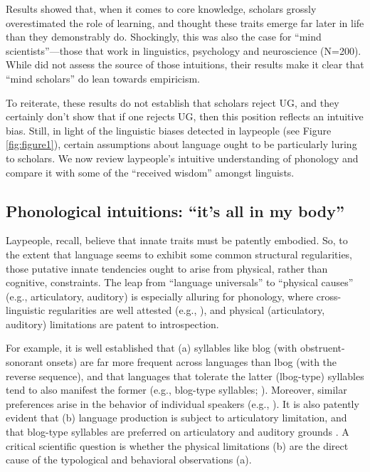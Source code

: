 \documentclass[output=paper,colorlinks,citecolor=brown
]{langscibook}
\begin{document}
Results showed that, when it comes to core knowledge, scholars grossly overestimated the role of learning, and thought these traits emerge far later in life than they demonstrably do. Shockingly, this was also the case for “mind scientists”—those that work in linguistics, psychology and neuroscience (N=200). While \cite{wang2019empiricism} did not assess the source of those intuitions, their results make it clear that “mind scholars” do lean towards empiricism.

To reiterate, these results do not establish that scholars reject UG, and they certainly don’t show that if one rejects UG, then this position reflects an intuitive bias. Still, in light of the linguistic biases detected in laypeople (see Figure \ref{fig:figure1}), certain assumptions about language ought to be particularly luring to scholars. We now review laypeople’s intuitive understanding of phonology and compare it with some of the “received wisdom” amongst linguists. 

\subsection{Phonological intuitions: “it’s all in my body”}

Laypeople, recall, believe that innate traits must be patently embodied. So, to the extent that language seems to exhibit some common structural regularities, those putative innate tendencies ought to arise from physical, rather than cognitive, constraints. The leap from “language universals” to “physical causes” (e.g., articulatory, auditory) is especially alluring for phonology, where cross-linguistic regularities are well attested (e.g., \cite{greenberg1966universals}), and physical (articulatory, auditory) limitations are patent to introspection. 

For example, it is well established that (a) syllables like blog (with obstruent-sonorant onsets) are far more frequent across languages than lbog (with the reverse sequence), and that languages that tolerate the latter (lbog-type) syllables tend to also manifest the former (e.g., blog-type syllables; \cite{greenberg1978some}). Moreover, similar preferences arise in the behavior of individual speakers (e.g., \cite{berent2013phonologicalb}). It is also patently evident that (b) language production is subject to articulatory limitation, and that blog-type syllables are preferred on articulatory and auditory grounds \cite{mattingly1981phonetic,wright2004review}. A critical scientific question is whether the physical limitations (b) are the direct cause of the typological and behavioral observations (a). 
\end{document}
